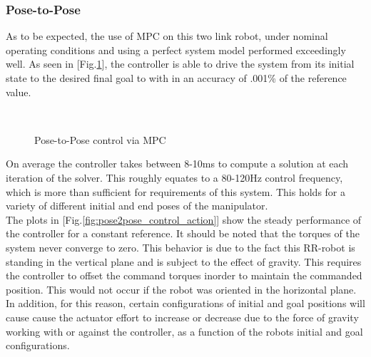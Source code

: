 \documentclass[journal]{IEEEtran}
\begin{document}
\subsubsection{Pose-to-Pose}

As to be expected, the use of MPC on this two link robot, under nominal operating conditions and using a perfect system model performed exceedingly well. As seen in [Fig.\ref{fig:pose2pose}], the controller is able to drive the system from its initial state to the desired final goal to with in an accuracy of .001\% of the reference value.

\begin{figure}[hb]%
    \centering
    \qquad
    \\
    \qquad
    \caption{Pose-to-Pose control via MPC}%
    \label{fig:pose2pose}%
\end{figure}

On average the controller takes between 8-10ms to compute a solution at each iteration of the solver. This roughly equates to a 80-120Hz control frequency, which is more than sufficient for requirements of this system. This holds for a variety of different initial and end poses of the manipulator. \\

The plots in [Fig.\ref{fig:pose2pose_control_action}] show the steady performance of the controller for a constant reference. It should be noted that the torques of the system never converge to zero. This behavior is due to the fact this RR-robot is standing in the vertical plane and is subject to the effect of gravity. This requires the controller to offset the command torques inorder to maintain the commanded position. This would not occur if the robot was oriented in the horizontal plane. In addition, for this reason, certain configurations of initial and goal positions will cause cause the actuator effort to increase or decrease due to the force of gravity working with or against the controller, as a function of the robots initial and goal configurations. \\
\end{document}
